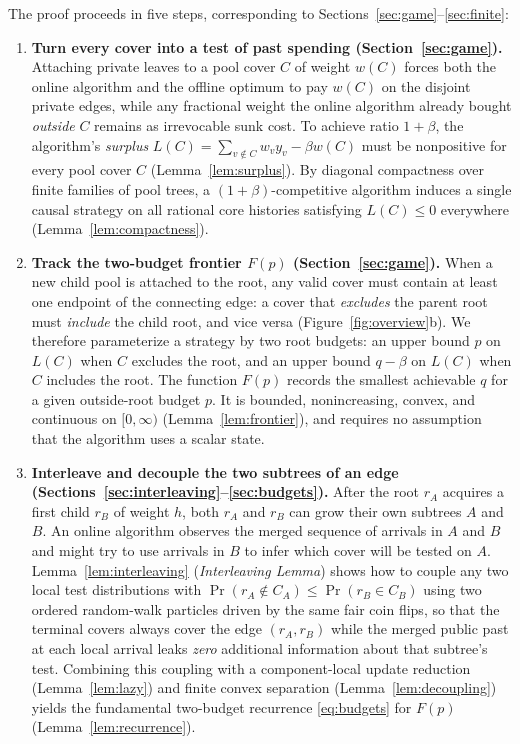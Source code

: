\documentclass[11pt,letterpaper]{article}
\begin{document}
The proof proceeds in five steps, corresponding to Sections~\ref{sec:game}--\ref{sec:finite}:

\begin{enumerate}
\item \textbf{Turn every cover into a test of past spending (Section~\ref{sec:game}).}
  Attaching private leaves to a pool cover $C$ of weight $w(C)$ forces both the online algorithm and the offline optimum to pay $w(C)$ on the disjoint private edges, while any fractional weight the online algorithm already bought \emph{outside} $C$ remains as irrevocable sunk cost. To achieve ratio $1+\beta$, the algorithm's \emph{surplus} $L(C) = \sum_{v\notin C} w_v y_v - \beta w(C)$ must be nonpositive for every pool cover $C$ (Lemma~\ref{lem:surplus}). By diagonal compactness over finite families of pool trees, a $(1+\beta)$-competitive algorithm induces a single causal strategy on all rational core histories satisfying $L(C)\le 0$ everywhere (Lemma~\ref{lem:compactness}).

\item \textbf{Track the two-budget frontier $F(p)$ (Section~\ref{sec:game}).}
  When a new child pool is attached to the root, any valid cover must contain at least one endpoint of the connecting edge: a cover that \emph{excludes} the parent root must \emph{include} the child root, and vice versa (Figure~\ref{fig:overview}b). We therefore parameterize a strategy by two root budgets: an upper bound $p$ on $L(C)$ when $C$ excludes the root, and an upper bound $q-\beta$ on $L(C)$ when $C$ includes the root. The function $F(p)$ records the smallest achievable $q$ for a given outside-root budget $p$. It is bounded, nonincreasing, convex, and continuous on $[0,\infty)$ (Lemma~\ref{lem:frontier}), and requires no assumption that the algorithm uses a scalar state.

\item \textbf{Interleave and decouple the two subtrees of an edge (Sections~\ref{sec:interleaving}--\ref{sec:budgets}).}
  After the root $r_A$ acquires a first child $r_B$ of weight $h$, both $r_A$ and $r_B$ can grow their own subtrees $A$ and $B$. An online algorithm observes the merged sequence of arrivals in $A$ and $B$ and might try to use arrivals in $B$ to infer which cover will be tested on $A$. Lemma~\ref{lem:interleaving} (\emph{Interleaving Lemma}) shows how to couple any two local test distributions with $\Pr(r_A\notin C_A)\le\Pr(r_B\in C_B)$ using two ordered random-walk particles driven by the same fair coin flips, so that the terminal covers always cover the edge $(r_A,r_B)$ while the merged public past at each local arrival leaks \emph{zero} additional information about that subtree's test. Combining this coupling with a component-local update reduction (Lemma~\ref{lem:lazy}) and finite convex separation (Lemma~\ref{lem:decoupling}) yields the fundamental two-budget recurrence \eqref{eq:budgets} for $F(p)$ (Lemma~\ref{lem:recurrence}).


\end{enumerate}
\end{document}
